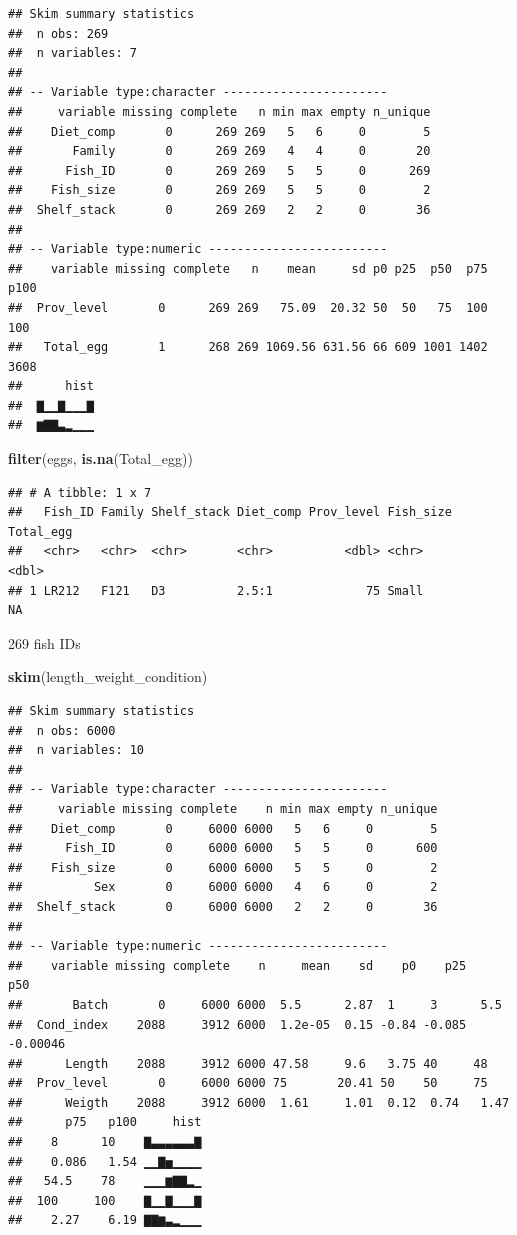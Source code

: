 \documentclass[]{book}
\newenvironment{Shaded}{\begin{snugshade}}{\end{snugshade}}
\newcommand{\KeywordTok}[1]{\textcolor[rgb]{0.13,0.29,0.53}{\textbf{#1}}}
\newcommand{\NormalTok}[1]{#1}
\begin{document}
\begin{verbatim}
## Skim summary statistics
##  n obs: 269 
##  n variables: 7 
## 
## -- Variable type:character -----------------------
##     variable missing complete   n min max empty n_unique
##    Diet_comp       0      269 269   5   6     0        5
##       Family       0      269 269   4   4     0       20
##      Fish_ID       0      269 269   5   5     0      269
##    Fish_size       0      269 269   5   5     0        2
##  Shelf_stack       0      269 269   2   2     0       36
## 
## -- Variable type:numeric -------------------------
##    variable missing complete   n    mean     sd p0 p25  p50  p75 p100
##  Prov_level       0      269 269   75.09  20.32 50  50   75  100  100
##   Total_egg       1      268 269 1069.56 631.56 66 609 1001 1402 3608
##      hist
##  ▇▁▁▇▁▁▁▇
##  ▆▇▇▃▂▁▁▁
\end{verbatim}

\begin{Shaded}
\begin{Highlighting}[]
\KeywordTok{filter}\NormalTok{(eggs, }\KeywordTok{is.na}\NormalTok{(Total_egg))}
\end{Highlighting}
\end{Shaded}

\begin{verbatim}
## # A tibble: 1 x 7
##   Fish_ID Family Shelf_stack Diet_comp Prov_level Fish_size Total_egg
##   <chr>   <chr>  <chr>       <chr>          <dbl> <chr>         <dbl>
## 1 LR212   F121   D3          2.5:1             75 Small            NA
\end{verbatim}

269 fish IDs

\begin{Shaded}
\begin{Highlighting}[]
\KeywordTok{skim}\NormalTok{(length_weight_condition)}
\end{Highlighting}
\end{Shaded}

\begin{verbatim}
## Skim summary statistics
##  n obs: 6000 
##  n variables: 10 
## 
## -- Variable type:character -----------------------
##     variable missing complete    n min max empty n_unique
##    Diet_comp       0     6000 6000   5   6     0        5
##      Fish_ID       0     6000 6000   5   5     0      600
##    Fish_size       0     6000 6000   5   5     0        2
##          Sex       0     6000 6000   4   6     0        2
##  Shelf_stack       0     6000 6000   2   2     0       36
## 
## -- Variable type:numeric -------------------------
##    variable missing complete    n     mean    sd    p0    p25      p50
##       Batch       0     6000 6000  5.5      2.87  1     3      5.5    
##  Cond_index    2088     3912 6000  1.2e-05  0.15 -0.84 -0.085 -0.00046
##      Length    2088     3912 6000 47.58     9.6   3.75 40     48      
##  Prov_level       0     6000 6000 75       20.41 50    50     75      
##      Weigth    2088     3912 6000  1.61     1.01  0.12  0.74   1.47   
##      p75   p100     hist
##    8      10    ▇▃▃▃▃▃▃▇
##    0.086   1.54 ▁▁▇▅▁▁▁▁
##   54.5    78    ▁▁▁▆▇▇▂▁
##  100     100    ▇▁▁▇▁▁▁▇
##    2.27    6.19 ▇▇▆▃▂▁▁▁
\end{verbatim}
\end{document}
